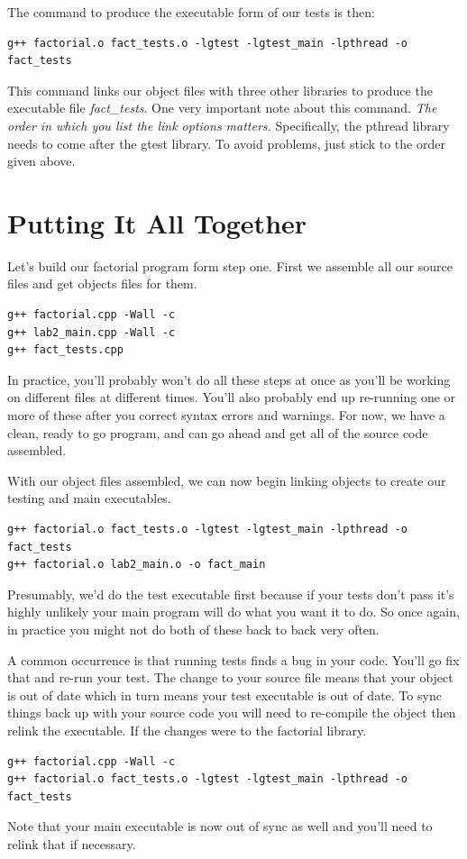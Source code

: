 \documentclass[]{tufte-handout}
\begin{document}
The command to produce the executable form of our tests is then:
\begin{verbatim}
g++ factorial.o fact_tests.o -lgtest -lgtest_main -lpthread -o fact_tests
\end{verbatim}
This command links our object files with three other libraries to produce the executable file \textit{fact\_tests}.  One very important note about this command.  \textit{The order in which you list the link options matters.} Specifically, the pthread library needs to come after the gtest library.  To avoid problems, just stick to the order given above.   


\section{Putting It All Together}

Let's build our factorial program form step one. First we assemble all our source files and get objects files for them.  
\begin{verbatim}
g++ factorial.cpp -Wall -c
g++ lab2_main.cpp -Wall -c
g++ fact_tests.cpp 
\end{verbatim}
In practice, you'll probably won't do all these steps at once as you'll be working on different files at different times.  You'll also probably end up re-running one or more of these after you correct syntax errors and warnings. For now, we have a clean, ready to go program, and can go ahead and get all of the source code assembled. 

With our object files assembled, we can now begin linking objects to create our testing and main executables.
\begin{verbatim}
g++ factorial.o fact_tests.o -lgtest -lgtest_main -lpthread -o fact_tests
g++ factorial.o lab2_main.o -o fact_main
\end{verbatim}
Presumably, we'd do the test executable first because if your tests don't pass it's highly unlikely your main program will do what you want it to do. So once again, in practice you might not do both of these back to back very often. 

A common occurrence is that running tests finds a bug in your code. You'll go fix that and re-run your test. The change to your source file means that your object is out of date which in turn means your test executable is out of date.  To sync things back up with your source code you will need to re-compile the object then relink the executable. If the changes were to the factorial library. 
\begin{verbatim}
g++ factorial.cpp -Wall -c
g++ factorial.o fact_tests.o -lgtest -lgtest_main -lpthread -o fact_tests
\end{verbatim}
Note that your main executable is now out of sync as well and you'll need to relink that if necessary.
\end{document}
